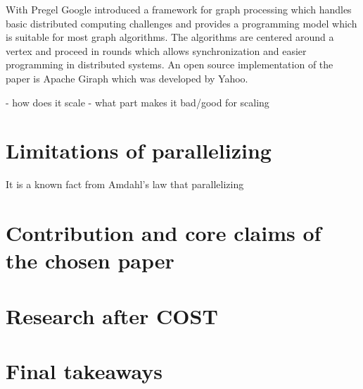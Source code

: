 \documentclass{format}
\begin{document}
With Pregel \cite{malewicz2010pregel} Google introduced a framework for graph processing which handles basic distributed computing challenges and provides a programming model which is suitable for most graph algorithms. The algorithms are centered around a vertex and proceed in rounds which allows synchronization and easier programming in distributed systems. An open source implementation of the paper is Apache Giraph which was developed by Yahoo.

- how does it scale
- what part makes it bad/good for scaling




\section{Limitations of parallelizing}

It is a known fact from Amdahl's law that parallelizing

\section{Contribution and core claims of the chosen paper}



\section{Research after COST}

\section{Final takeaways}



\end{document}
